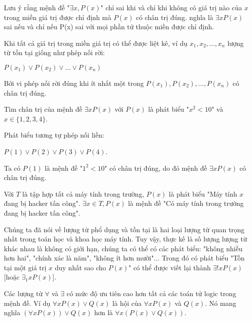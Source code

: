 \documentclass{standalone} %
\begin{document}
        Lưu ý rằng mệnh đề "$\exists x, P(x)$" chỉ sai khi và chỉ khi không có giá trị nào của $x$ trong miền giá trị được chỉ định mà $P(x)$ có chân trị đúng. nghĩa là $\exists x P(x)$ sai nếu và chỉ nếu P(x) sai với mọi phần tử thuộc miền được chỉ định.
        
        Khi tất cả giá trị trong miền giá trị có thể được liệt kê, ví dụ $x_1, x_2, ..., x_n$ lượng từ tồn tại giống như phép nối rời:
        \begin{center}
            $P(x_1) \lor P(x_2) \lor ... \lor P(x_n)$
        \end{center}
        Bởi vi phép nối rời đúng khi ít nhất một trong $P(x_1), P(x_2), ..., P(x_n)$ có chân trị đúng.
        
        \begin{example}
            Tìm chân trị của mệnh đề $\exists x P(x)$ với $P(x)$ là phát biểu "$x^2 < 10$" và $x \in \{ 1, 2, 3, 4 \}$.
        \end{example}
        
        Phát biểu tương tự phép nối liền:
        \begin{center}
            $P(1) \lor P(2) \lor P(3) \lor P(4)$.
        \end{center}
        Ta có $P(1)$ là mệnh đề "$1^2 < 10$" có chân trị đúng, do đó mệnh đề $\exists x P(x)$ có chân trị đúng.
        
        \begin{example}
            Với $T$ là tập hợp tất cả máy tính trong trường, $P(x)$ là phát biểu "Máy tính $x$ đang bị hacker tấn công". $\exists x \in T, P(x)$ là mệnh đề "Có máy tính trong trường đang bị hacker tấn công".
        \end{example}
        
        Chúng ta đã nói về lượng từ phổ dụng và tồn tại là hai loại lượng từ quan trọng nhất trong toán học và khoa học máy tính. Tuy vậy, thực kế là số lượng lượng từ khác nhau là không có giới hạn, chúng ta có thể có các phát biểu: "không nhiều hơn hai", "chính xác là năm", "không ít hơn mười"... Trong đó có phát biểu "Tồn tại một giá trị $x$ duy nhất sao cho $P(x)$" có thể được viết lại thành $\exists ! x P(x)$ [hoặc $\exists_1 x P(x)$].
        
        Các lượng từ $\forall$ và $\exists$ có mức độ ưu tiên cao hơn tất cả các toán tử logic trong mệnh đề. Ví dụ $\forall x P(x) \lor Q(x)$ là hội của $\forall x P(x)$ và $Q(x)$. Nó mang nghĩa $(\forall x P(x)) \lor Q(x)$ hơn là $\forall x (P(x) \lor Q(x))$.
        
\end{document}
